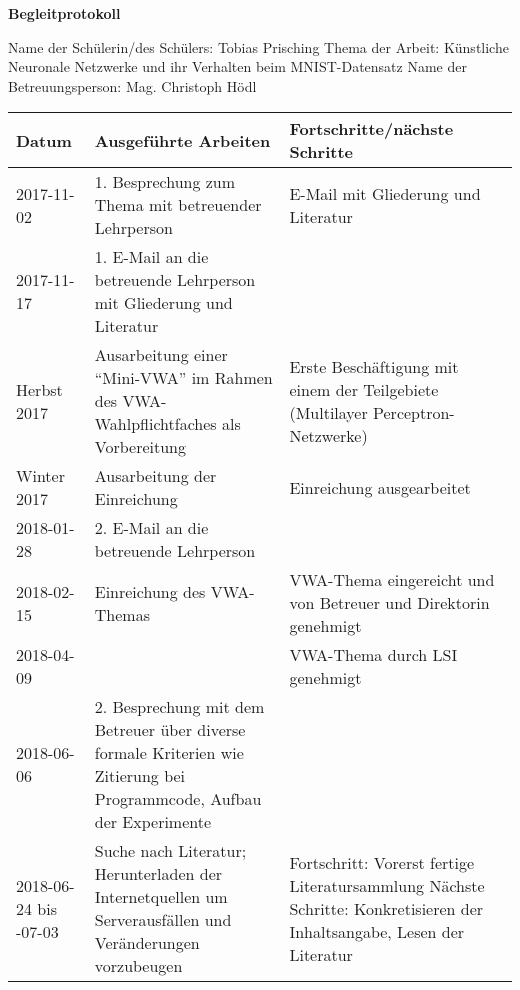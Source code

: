 \documentclass[a4paper,12pt,ngerman,oneside]{scrreprt}
\begin{document}
	\pagestyle{empty}
	\begin{center}	
		\vspace*{15mm}\huge\centering\textbf{Begleitprotokoll\break}
	\end{center}
	\vspace*{-5mm}
	Name der Schülerin/des Schülers: {Tobias Prisching}
	\newline Thema der Arbeit: {Künstliche Neuronale Netzwerke und ihr Verhalten beim  MNIST-Datensatz}
	\newline Name der Betreuungsperson: {Mag. Christoph Hödl}
	
	\vspace{1cm}
	\setlength\LTleft{0mm}
	\begin{longtable}{|p{21mm}|p{71mm}|p{66mm}|}
			
		\hline
		Datum & Ausgeführte Arbeiten & Fortschritte/nächste Schritte \\
		\hline
		2017-11-02 & 1. Besprechung zum Thema mit betreuender Lehrperson & E-Mail mit Gliederung und Literatur \\\hline
		2017-11-17 & 1. E-Mail an die betreuende Lehrperson mit Gliederung und Literatur & \\\hline
		Herbst 2017 & Ausarbeitung einer "`Mini-VWA"' im Rahmen des VWA-Wahlpflichtfaches als Vorbereitung & Erste Beschäftigung mit einem der Teilgebiete (Multilayer Perceptron-Netzwerke) \\\hline
		Winter 2017 & Ausarbeitung der Einreichung & Einreichung ausgearbeitet \\\hline
		2018-01-28 & 2. E-Mail an die betreuende Lehrperson & \\\hline
		2018-02-15 & Einreichung des VWA-Themas & VWA-Thema eingereicht und von Betreuer und Direktorin genehmigt \\\hline
		2018-04-09 &  & VWA-Thema durch LSI genehmigt\\\hline
		2018-06-06 & 2. Besprechung mit dem Betreuer über diverse formale Kriterien wie Zitierung bei Programmcode, Aufbau der Experimente & \\\hline
		2018-06-24 \newline bis \newline 2018-07-03 & Suche nach Literatur; Herunterladen der Internetquellen um Serverausfällen und Veränderungen vorzubeugen & Fortschritt: Vorerst fertige Literatursammlung \newline Nächste Schritte: Konkretisieren der Inhaltsangabe, Lesen der Literatur \\\hline

\end{longtable}
\end{document}

